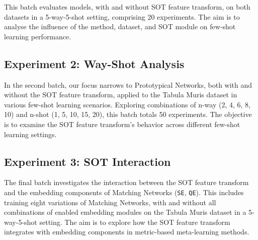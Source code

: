 This batch evaluates models, with and without SOT feature transform, on both datasets in a 5-way-5-shot setting, comprising 20 experiments. The aim is to analyse the influence of the method, dataset, and SOT module on few-shot learning performance.

\subsection{Experiment 2: Way-Shot Analysis}

In the second batch, our focus narrows to Prototypical Networks, both with and without the SOT feature transform, applied to the Tabula Muris dataset in various few-shot learning scenarios. Exploring combinations of n-way ({2, 4, 6, 8, 10}) and n-shot ({1, 5, 10, 15, 20}), this batch totals 50 experiments. The objective is to examine the SOT feature transform's behavior across different few-shot learning settings.

\subsection{Experiment 3: SOT Interaction} 

The final batch investigates the interaction between the SOT feature transform and the embedding components of Matching Networks (\texttt{SE}, \texttt{QE}). This includes training eight variations of Matching Networks, with and without all combinations of enabled embedding modules on the Tabula Muris dataset in a 5-way-5-shot setting. The aim is to explore how the SOT feature transform integrates with embedding components in metric-based meta-learning methods.

